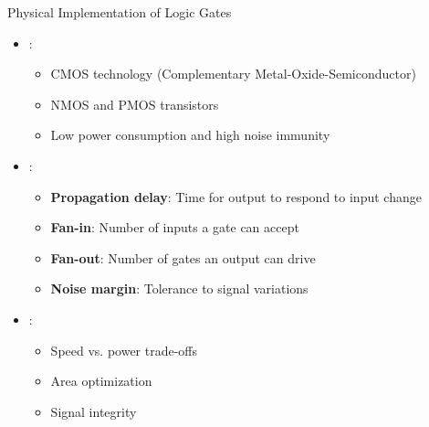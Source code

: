 \begin{frame}{Physical Implementation of Logic Gates}
\begin{itemize}
\item {}:
\begin{itemize}
\item CMOS technology (Complementary Metal-Oxide-Semiconductor)
\item NMOS and PMOS transistors
\item Low power consumption and high noise immunity
\end{itemize}
\vspace{0.5cm}
\item {}:
\begin{itemize}
\item \textbf{Propagation delay}: Time for output to respond to input change
\item \textbf{Fan-in}: Number of inputs a gate can accept
\item \textbf{Fan-out}: Number of gates an output can drive
\item \textbf{Noise margin}: Tolerance to signal variations
\end{itemize}
\vspace{0.3cm}
\item {}:
\begin{itemize}
\item Speed vs. power trade-offs
\item Area optimization
\item Signal integrity
\end{itemize}
\end{itemize}
\end{frame}

